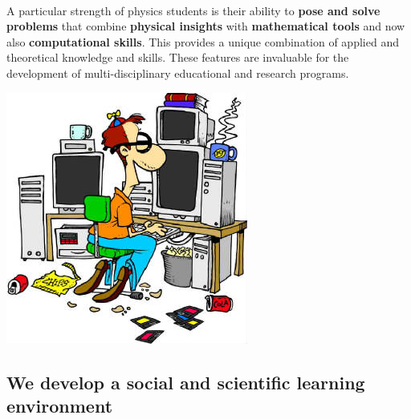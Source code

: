 \documentclass[%
oneside,                 %
final,                   %
10pt]{article}
\begin{document}

\paragraph{}
A particular strength of physics students is their ability to \textbf{pose and
solve problems} that combine \textbf{physical insights} with \textbf{mathematical tools}
and now also \textbf{computational skills}. This provides a unique combination
of applied and theoretical knowledge and skills. These features are invaluable
for the development of multi-disciplinary educational and research programs.





\centerline{\includegraphics[width=1.0\linewidth]{fig-future/computer_nerd2.jpg}}




\subsection{We develop a social and scientific learning environment}


\end{document}

